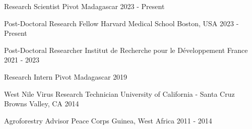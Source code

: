 

\begin{cventries}

    \cventry
    {Research Scientist} %
    {Pivot} %
    {Madagascar} %
    {2023 - Present} %

    \cventry
    {Post-Doctoral Research Fellow} %
    {Harvard Medical School} %
    {Boston, USA} %
    {2023 - Present} %

   
   \cventry
    {Post-Doctoral Researcher} %
    {Institut de Recherche pour le Développement} %
    {France} %
    {2021 - 2023} %

  \cventry
    {Research Intern} %
    {Pivot} %
    {Madagascar} %
    {2019} %

  \cventry
    {West Nile Virus Research Technician} %
    {University of California - Santa Cruz} %
    {Browns Valley, CA} %
    {2014} %

  \cventry
    {Agroforestry Advisor} %
    {Peace Corps} %
    {Guinea, West Africa} %
    {2011 - 2014} %



\end{cventries}
